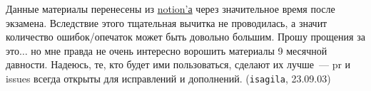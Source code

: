 Данные материалы перенесены из
\href{https://awes0me.notion.site/EX-01-3fd1bc4e706c423fb69d157cfc7e0a2a?pvs=25}
{notion'а} через значительное время после экзамена. Вследствие этого тщательная
вычитка не проводилась, а значит количество ошибок/опечаток может быть довольно
большим. Прошу прощения за это\(\dotsc\) но мне правда не очень интересно
ворошить материалы 9 месячной давности. Надеюсь, те, кто будет ими пользоваться,
сделают их лучше~--- pr и issues всегда открыты для исправлений и дополнений.
(\texttt{isagila}, 23.09.03)
